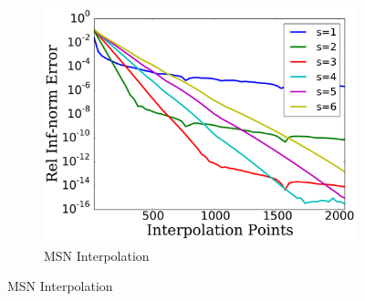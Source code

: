 
\begin{figure}[p]
    \centering
    \begin{subfigure}{0.45\textwidth}
    \includegraphics[width=\textwidth]{plots/msn_interp_fast_2n_rough_heaviside.pdf}
    \caption{MSN Interpolation}
    \end{subfigure}


\end{figure}

